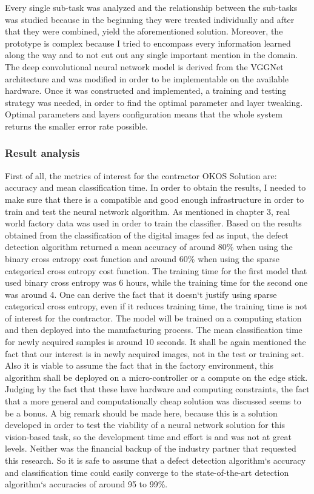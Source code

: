 \documentclass[12pt,a4paper,twoside]{report}
\begin{document}
Every single sub-task was analyzed and the relationship between the sub-tasks was studied because in the beginning they were treated individually and after that they were combined, yield the aforementioned solution. Moreover, the prototype is complex because I tried to encompass every information learned along the way and to not cut out any single important mention in the domain. The deep convolutional neural network model is derived from the VGGNet architecture\cite{article-vgg} and was modified in order to be implementable on the available hardware. Once it was constructed and implemented, a training and testing strategy was needed, in order to find the optimal parameter and layer tweaking. Optimal parameters and layers configuration means that the whole system returns the smaller error rate possible.


\subsubsection{Result analysis}
First of all, the metrics of interest for the contractor OKOS Solution are: accuracy and mean classification time. In order to obtain the results, I needed to make sure that there is a compatible and good enough infrastructure in order to train and test the neural network algorithm. As mentioned in chapter 3, real world factory data was used in order to train the classifier. Based on the results obtained from the classification of the digital images fed as input, the defect detection algorithm returned a mean accuracy of around 80\% when using the binary cross entropy cost function and around 60\% when using the sparse categorical cross entropy cost function. The training time for the first model that used binary cross entropy was 6 hours, while the training time for the second one was around 4. One can derive the fact that it doesn`t justify using sparse categorical cross entropy, even if it reduces training time, the training time is not of interest for the contractor. The model will be trained on a computing station and then deployed into the manufacturing process. The mean classification time for newly acquired samples is around 10 seconds. It shall be again mentioned the fact that our interest is in newly acquired images, not in the test or training set. Also it is viable to assume the fact that in the factory environment, this algorithm shall be deployed on a micro-controller or a compute on the edge stick. Judging by the fact that these have hardware and computing constraints, the fact that a more general and computationally cheap solution was discussed seems to be a bonus. A big remark should be made here, because this is a solution developed in order to test the viability of a neural network solution for this vision-based task, so the development time and effort is and was not at great levels. Neither was the financial backup of the industry partner that requested this research. So it is safe to assume that a defect detection algorithm`s accuracy and classification time could easily converge to the state-of-the-art detection algorithm`s accuracies of around 95 to 99\%\cite{book-deeplearning}\cite{article-lecun}.\par
\end{document}
